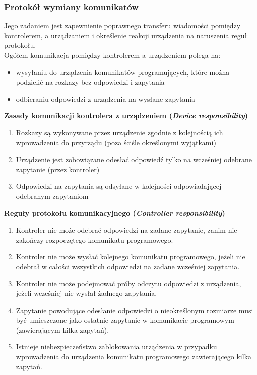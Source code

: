 \subsubsection{Protokół wymiany komunikatów}
Jego zadaniem jest zapewnienie poprawnego transferu wiadomości pomiędzy kontrolerem, a urządzaniem i określenie reakcji urządzenia na naruszenia reguł protokołu.\\
Ogółem komunikacja pomiędzy kontrolerem a urządzeniem polega na:
\begin{itemize}
	\item wysyłaniu do urządzenia komunikatów programujących, które można podzielić na rozkazy bez odpowiedzi i zapytania
	\item odbieraniu odpowiedzi z urządzenia na wysłane zapytania
\end{itemize}
\textbf{Zasady komunikacji kontrolera z urządzeniem (\emph{Device responsibility})}
\begin{enumerate}
	\item Rozkazy są wykonywane przez urządzenie zgodnie z kolejnością ich wprowadzenia do przyrządu (poza ściśle określonymi wyjątkami)
	\item Urządzenie jest zobowiązane odesłać odpowiedź tylko na wcześniej odebrane zapytanie (przez kontroler)
	\item Odpowiedzi na zapytania są odsyłane w kolejności odpowiadającej odebranym zapytaniom
\end{enumerate}
\newpage
\textbf{Reguły protokołu komunikacyjnego (\emph{Controller responsibility})}
\begin{enumerate}
	\item Kontroler nie może odebrać odpowiedzi na zadane zapytanie, zanim nie zakończy rozpoczętego komunikatu programowego.
	\item Kontroler nie może wysłać kolejnego komunikatu programowego, jeżeli nie odebrał w całości wszystkich odpowiedzi na zadane wcześniej zapytania.
	\item Kontroler nie może podejmować próby odczytu odpowiedzi z urządzenia, jeżeli wcześniej nie wysłał żadnego zapytania.
	\item Zapytanie powodujące odesłanie odpowiedzi o nieokreślonym rozmiarze musi być umieszczone jako ostatnie zapytanie w komunikacie programowym (zawierającym kilka zapytań).
	\item Istnieje niebezpieczeństwo zablokowania urządzenia w przypadku wprowadzenia do urządzenia komunikatu programowego zawierającego kilka zapytań.
\end{enumerate}


